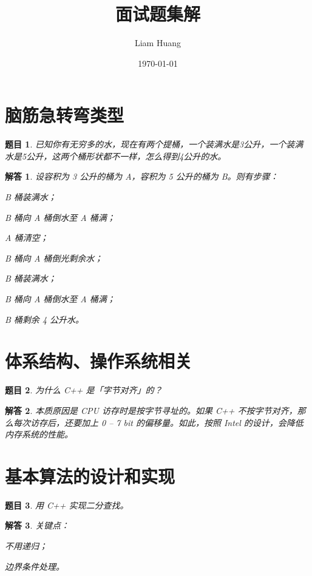 \documentclass[UTF8, final]{ctexart}
\title{面试题集解}
\author{Liam Huang}
\date{\today}
\newtheorem{question}{题目}
\newtheorem{solution}{解答}
\begin{document}
\maketitle
\tableofcontents

\section{脑筋急转弯类型}
\begin{question}
已知你有无穷多的水，现在有两个提桶，一个装满水是3公升，一个装满水是5公升，这两个桶形状都不一样，怎么得到4公升的水。
\end{question}
\begin{solution}
设容积为 3 公升的桶为 A，容积为 5 公升的桶为 B。则有步骤：
\begin{compactitem}
    \item B 桶装满水；
    \item B 桶向 A 桶倒水至 A 桶满；
    \item A 桶清空；
    \item B 桶向 A 桶倒光剩余水；
    \item B 桶装满水；
    \item B 桶向 A 桶倒水至 A 桶满；
    \item B 桶剩余 4 公升水。
\end{compactitem}
\end{solution}

\section{体系结构、操作系统相关}
\begin{question}
为什么 C++ 是「字节对齐」的？
\end{question}
\begin{solution}
本质原因是 CPU 访存时是按字节寻址的。如果 C++ 不按字节对齐，那么每次访存后，还要加上 0 -- 7 bit 的偏移量。如此，按照 Intel 的设计，会降低内存系统的性能。
\end{solution}

\section{基本算法的设计和实现}
\begin{question}
用 C++ 实现二分查找。
\end{question}
\begin{solution}
关键点：
\begin{compactitem}
    \item 不用递归；
    \item 边界条件处理。
\end{compactitem}

\end{solution}
\end{document}
